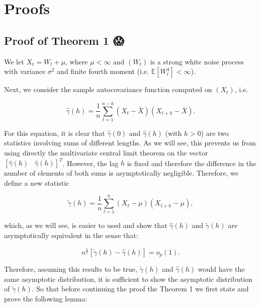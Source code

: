 \documentclass[]{book}
\theoremstyle{definition}
\theoremstyle{definition}
\theoremstyle{definition}
\theoremstyle{remark}
\begin{document}
\hypertarget{appendix-appendix}{%
\appendix}


\hypertarget{appendixa}{%
\chapter{Proofs}\label{appendixa}}

\hypertarget{proof-of-theorem-1}{%
\section{Proof of Theorem 1 😱}\label{proof-of-theorem-1}}

We let \(X_t = W_t + \mu\), where \(\mu < \infty\) and \((W_t)\) is a
strong white noise process with variance \(\sigma^2\) and finite fourth
moment (i.e. \(\mathbb{E} [W_t^4] < \infty\)).

Next, we consider the sample autocovariance function computed on
\((X_t)\), i.e.

\[
\hat \gamma \left( h \right) = \frac{1}{n}\sum\limits_{t = 1}^{n - h} {\left( {{X_t} - \bar X} \right)\left( {{X_{t + h}} - \bar X} \right)}.
\]

For this equation, it is clear that \(\hat \gamma \left( 0 \right)\) and
\(\hat \gamma \left( h \right)\) (with \(h > 0\)) are two statistics
involving sums of different lengths. As we will see, this prevents us
from using directly the multivariate central limit theorem on the vector
\([ \hat \gamma \left( h \right) \;\;\; \hat \gamma \left( h \right) ]^T\).
However, the lag \(h\) is fixed and therefore the difference in the
number of elements of both sums is asymptotically negligible. Therefore,
we define a new statistic

\[\tilde{\gamma} \left( h \right) = \frac{1}{n}\sum\limits_{t = 1}^{n} {\left( {{X_t} - \mu} \right)\left( {{X_{t + h}} - \mu} \right)},
\]

which, as we will see, is easier to used and show that
\(\hat \gamma \left( h \right)\) and \(\tilde{\gamma} \left( h \right)\)
are asymptotically equivalent in the sense that:

\[
n^{\frac{1}{2}}[\tilde{\gamma} \left( h \right) - \hat \gamma \left( h \right)] = o_p(1).
\]

Therefore, assuming this results to be true,
\(\tilde{\gamma} \left( h \right)\) and \(\hat \gamma \left( h \right)\)
would have the same asymptotic distribution, it is sufficient to show
the asymptotic distribution of \(\tilde{\gamma} \left( h \right)\). So
that before continuing the proof the Theorem 1 we first state and prove
the following lemma:
\end{document}

